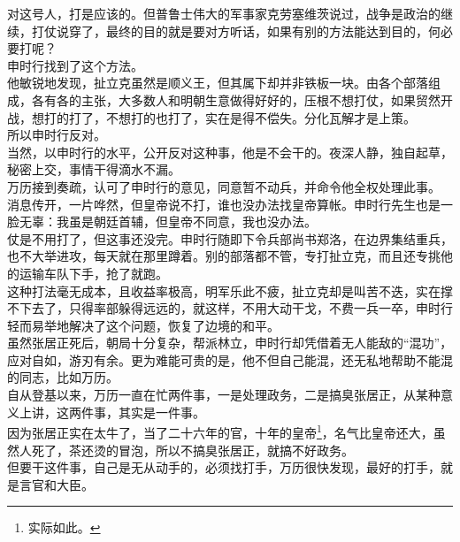 \begin{multicols}{\theparacolNo}
对这号人，打是应该的。但普鲁士伟大的军事家克劳塞维茨说过，战争是政治的继续，打仗说穿了，最终的目的就是要对方听话，如果有别的方法能达到目的，何必要打呢？\\

申时行找到了这个方法。\\

他敏锐地发现，扯立克虽然是顺义王，但其属下却并非铁板一块。由各个部落组成，各有各的主张，大多数人和明朝生意做得好好的，压根不想打仗，如果贸然开战，想打的打了，不想打的也打了，实在是得不偿失。分化瓦解才是上策。\\

所以申时行反对。\\

当然，以申时行的水平，公开反对这种事，他是不会干的。夜深人静，独自起草，秘密上交，事情干得滴水不漏。\\

万历接到奏疏，认可了申时行的意见，同意暂不动兵，并命令他全权处理此事。\\

消息传开，一片哗然，但皇帝说不打，谁也没办法找皇帝算帐。申时行先生也是一脸无辜：我虽是朝廷首辅，但皇帝不同意，我也没办法。\\

仗是不用打了，但这事还没完。申时行随即下令兵部尚书郑洛，在边界集结重兵，也不大举进攻，每天就在那里蹲着。别的部落都不管，专打扯立克，而且还专挑他的运输车队下手，抢了就跑。\\

这种打法毫无成本，且收益率极高，明军乐此不疲，扯立克却是叫苦不迭，实在撑不下去了，只得率部躲得远远的，就这样，不用大动干戈，不费一兵一卒，申时行轻而易举地解决了这个问题，恢复了边境的和平。\\

虽然张居正死后，朝局十分复杂，帮派林立，申时行却凭借着无人能敌的“混功”，应对自如，游刃有余。更为难能可贵的是，他不但自己能混，还无私地帮助不能混的同志，比如万历。\\

自从登基以来，万历一直在忙两件事，一是处理政务，二是搞臭张居正，从某种意义上讲，这两件事，其实是一件事。\\

因为张居正实在太牛了，当了二十六年的官，十年的皇帝\footnote{实际如此。}，名气比皇帝还大，虽然人死了，茶还烫的冒泡，所以不搞臭张居正，就搞不好政务。\\

但要干这件事，自己是无从动手的，必须找打手，万历很快发现，最好的打手，就是言官和大臣。\\


\end{multicols}
